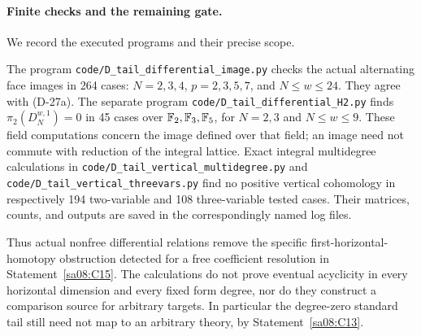 \paragraph{Finite checks and the remaining gate.}
We record the executed programs and their precise scope.

The program \texttt{code/D\_tail\_differential\_image.py}
checks the actual alternating face images in 264 cases:
\(N=2,3,4\), \(p=2,3,5,7\), and \(N\le w\le24\).
They agree with (D-27a).
The separate program
\texttt{code/D\_tail\_differential\_H2.py} finds
\(\pi_2(D_N^{w,1})=0\) in 45 cases over
\(\mathbb F_2,\mathbb F_3,\mathbb F_5\), for \(N=2,3\) and \(N\le w\le9\).
These field computations concern the image defined over
that field; an image need not commute with reduction
of the integral lattice.
Exact integral multidegree calculations in
\texttt{code/D\_tail\_vertical\_multidegree.py} and
\texttt{code/D\_tail\_vertical\_threevars.py} find no
positive vertical cohomology in respectively 194
two-variable and 108 three-variable tested cases.
Their matrices, counts, and outputs are saved in
the correspondingly named log files.

Thus actual nonfree differential relations remove the
specific first-horizontal-homotopy obstruction detected
for a free coefficient resolution in
Statement~\ref{sa08:C15}. The calculations do not prove
eventual acyclicity in every horizontal dimension and
every fixed form degree, nor do they construct a
comparison source for arbitrary targets. In particular
the degree-zero standard tail still need not map to an
arbitrary theory, by Statement~\ref{sa08:C13}.
